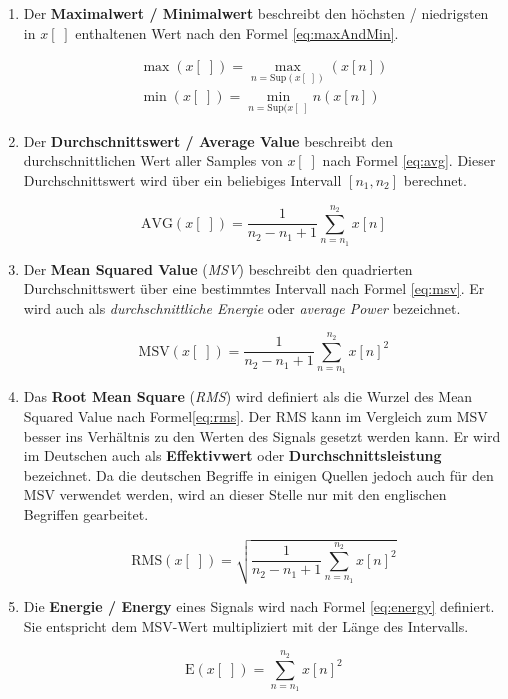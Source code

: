 \begin{enumerate}[leftmargin=*]
	
	\item Der \textbf{Maximalwert / Minimalwert} beschreibt den höchsten / niedrigsten in  $x[\;]$ enthaltenen Wert nach den Formel \ref{eq:maxAndMin}.
	
	\begin{equation}
	\begin{gathered}
	\max(x[\;]) = \max\limits_{n=\text{Sup}(x[\;]) }(x[n]) \\ 
	\min(x[\;])= \min\limits_{n=\text{Sup}(x[\;]}{n}(x[n])
	\end{gathered}
	\label{eq:maxAndMin}
	\end{equation}
	
	
	\item Der \textbf{Durchschnittswert / Average Value} beschreibt den durchschnittlichen Wert aller Samples von $x[\;]$ nach Formel \ref{eq:avg}. Dieser Durchschnittswert wird über ein beliebiges Intervall $[n_1, n_2]$ berechnet.
	
	\begin{equation}
	\text{AVG}(x[\;]) = \frac{1}{n_2 - n_1 + 1} \sum_{n = n_1}^{n_2} x[n]
	\label{eq:avg}
	\end{equation}
	
	\item Der \textbf{Mean Squared Value} (\emph{MSV}) beschreibt den quadrierten Durchschnittswert über eine bestimmtes Intervall nach Formel \ref{eq:msv}. Er wird auch als \emph{durchschnittliche Energie} oder \emph{average Power} bezeichnet.
	
	\begin{equation}
	\text{MSV}(x[\;]) = \frac{1}{n_2 - n_1 + 1} \sum_{n = n_1}^{n_2} x[n]^2
	\label{eq:msv}
	\end{equation}
	
	\item Das \textbf{Root Mean Square} (\emph{RMS}) wird definiert als die Wurzel des Mean Squared Value nach Formel\ref{eq:rms}. Der RMS kann im Vergleich zum MSV besser ins Verhältnis zu den Werten des Signals gesetzt werden kann. Er wird im Deutschen auch als \textbf{Effektivwert} oder \textbf{Durchschnittsleistung} bezeichnet. Da die deutschen Begriffe in einigen Quellen jedoch auch für den MSV verwendet werden, wird an dieser Stelle nur mit den englischen Begriffen gearbeitet.
	
	\begin{equation}
	\text{RMS}(x[\;]) = \sqrt{\frac{1}{n_2 - n_1 + 1} \sum_{n = n_1}^{n_2} x[n]^2}
	\label{eq:rms}
	\end{equation}
	
	\item Die \textbf{Energie / Energy} eines Signals wird nach Formel \ref{eq:energy} definiert. Sie entspricht dem MSV-Wert multipliziert mit der Länge des Intervalls. \cite[S. 27-28]{dspMichigan}
	
	\begin{equation}
	\text{E}(x[\;]) = \sum_{n = n_1}^{n_2} x[n]^2
	\label{eq:energy}
	\end{equation}
	
\end{enumerate}	

